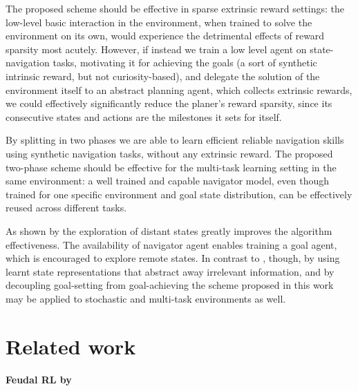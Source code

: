 \documentclass[acmsmall, nonacm]{acmart}
\begin{document}
The proposed scheme should be effective in sparse extrinsic reward settings: the low-level basic interaction in the environment, when trained to solve the environment on its own, would experience the detrimental effects of reward sparsity most acutely. However, if instead we train a low level agent on state-navigation tasks, motivating it for achieving the goals (a sort of synthetic intrinsic reward, but not curiosity-based), and delegate the solution of the environment itself to an abstract planning agent, which collects extrinsic rewards, we could effectively significantly reduce the planer's reward sparsity, since its consecutive states and actions are the milestones it sets for itself.

By splitting in two phases we are able to learn efficient reliable navigation skills using synthetic navigation tasks, 
without any extrinsic reward.
%
The proposed two-phase scheme should be effective for the multi-task learning setting in the same environment: a well trained and capable navigator model, even though trained for one specific environment and goal state distribution, can be effectively reused across different tasks.

As shown by \citet{ecoffet_first_2021} the exploration of distant states greatly improves the algorithm effectiveness. The availability of navigator agent enables training a goal agent, which is encouraged to explore remote states.
%
In contrast to \citep{ecoffet_first_2021}, though, by using learnt state representations that abstract away irrelevant information, and by decoupling goal-setting from goal-achieving the scheme proposed in this work may be applied to stochastic and multi-task environments as well.

\section{Related work}
\label{sec:related_work}

\paragraph{Feudal RL by~\citet{Dayan1992FeudalRL}} %
\label{par:feudal_rl}
\end{document}
